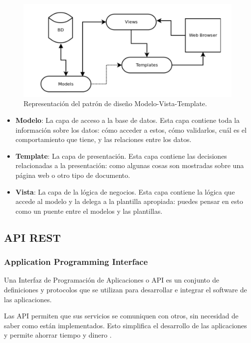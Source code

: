 \begin{figure}
    \centering
    \includegraphics[width=\textwidth]{capitulo2/images/mtv.png}
    \caption{Representación del patrón de diseño Modelo-Vista-Template.}
    \label{fig:mtv}
\end{figure}

\begin{itemize}
    \item \textbf{Modelo}: La capa de acceso a la base de datos. Esta capa contiene toda la información sobre los datos: cómo acceder a estos, cómo validarlos, cuál es el comportamiento que tiene, y las relaciones entre los datos.
    \item \textbf{Template}: La capa de presentación. Esta capa contiene las decisiones relacionadas a la presentación: como algunas cosas son mostradas sobre una página web o otro tipo de documento.
    \item \textbf{Vista}: La capa de la lógica de negocios. Esta capa contiene la lógica que accede al modelo y la delega a la plantilla apropiada: puedes pensar en esto como un puente entre el modelos y las plantillas.
\end{itemize}


\subsection{API REST}
\subsubsection{Application Programming Interface}
Una Interfaz de Programación de Aplicaciones o API es un conjunto de definiciones y protocolos que se utilizan para desarrollar e integrar el software de las aplicaciones.

Las API permiten que sus servicios se comuniquen con otros, sin necesidad de saber como están implementados. Esto simplifica el desarrollo de las aplicaciones y permite ahorrar tiempo y dinero \cite{apiArticle}.
